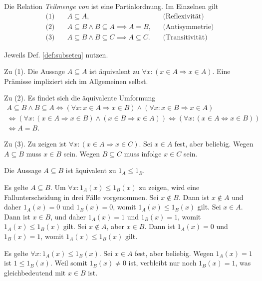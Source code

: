 \begin{Satz}
Die Relation \emph{Teilmenge von} ist eine Partialordnung.
Im Einzelnen gilt%
\begin{align*}
\text{(1)}\quad & A\subseteq A, && \text{(Reflexivität)}\\
\text{(2)}\quad & A\subseteq B\land B\subseteq A \implies A = B, && \text{(Antisymmetrie)}\\
\text{(3)}\quad & A\subseteq B\land B\subseteq C \implies A\subseteq C. && \text{(Transitivität)}
\end{align*}
\end{Satz}
\begin{Beweis}
Jeweils Def. \ref{def:subseteq} nutzen.

Zu (1). Die Aussage $A\subseteq A$ ist 
äquivalent zu $\forall x\colon (x\in A\Rightarrow x\in A)$.
Eine Prämisse impliziert sich im Allgemeinen selbst.

Zu (2). Es findet sich die äquivalente Umformung
\begin{gather*}
A\subseteq B\land B\subseteq A\iff
(\forall x\colon x\in A\Rightarrow x\in B)
\land (\forall x\colon x\in B\Rightarrow x\in A)\\
\iff (\forall x\colon (x\in A\Rightarrow x\in B)\land (x\in B\Rightarrow x\in A))
\iff (\forall x\colon (x\in A\Leftrightarrow x\in B))\\
\iff A = B.
\end{gather*}

Zu (3). Zu zeigen ist $\forall x\colon (x\in A\Rightarrow x\in C)$.
Sei $x\in A$ fest, aber beliebig. Wegen $A\subseteq B$ muss $x\in B$
sein. Wegen $B\subseteq C$ muss infolge $x\in C$ sein.\,\qedsymbol
\end{Beweis}

\begin{Satz}
Die Aussage $A\subseteq B$ ist äquivalent zu $1_A\le 1_B$.
\end{Satz}
\begin{Beweis}
Es gelte $A\subseteq B$. Um $\forall x\colon 1_A(x)\le 1_B(x)$ zu
zeigen, wird eine Fallunterscheidung in drei Fälle vorgenommen.
Sei $x\notin B$. Dann ist $x\notin A$
und daher $1_A(x)=0$ und $1_B(x)=0$, womit $1_A(x)\le 1_B(x)$ gilt.
Sei $x\in A$. Dann ist $x\in B$, und daher $1_A(x)=1$ und $1_B(x)=1$,
womit $1_A(x)\le 1_B(x)$ gilt.
Sei $x\notin A$, aber $x\in B$. Dann ist $1_A(x)=0$ und $1_B(x)=1$,
womit $1_A(x)\le 1_B(x)$ gilt.

Es gelte $\forall x\colon 1_A(x)\le 1_B(x)$. Sei $x\in A$ fest,
aber beliebig. Wegen $1_A(x)=1$ ist $1\le 1_B(x)$. Weil somit
$1_B(x)\ne 0$ ist, verbleibt nur noch $1_B(x)=1$, was
gleichbedeutend mit $x\in B$ ist.\,\qedsymbol
\end{Beweis}

